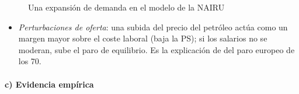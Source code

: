 \documentclass[11pt]{article}
\begin{document}
\begin{figure}[H]
\centering
\caption{Una expansión de demanda en el modelo de la NAIRU}\label{fig:nairu-demanda-pasos}
\end{figure}

\begin{itemize}
\item \emph{Perturbaciones de oferta}: una subida del precio del petróleo actúa como un margen mayor sobre el coste laboral (baja la PS); si los salarios no se moderan, sube el paro de equilibrio. Es la explicación de \textcite{BrunoSachs1985Economics} del paro europeo de los 70.
\end{itemize}

\paragraph{c) Evidencia empírica}
\end{document}
